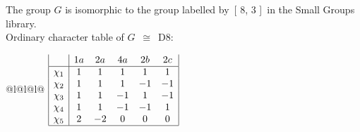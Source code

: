 \documentclass[varwidth=\maxdimen,border=10]{standalone}
\begin{document}
The group $G$ is isomorphic to the group labelled by\ [ 8, 3 ]\ in the Small Groups library.\\
Ordinary character table of $G$\ $\cong$\ D8:\\
\begin{center}
\begin{tabular}{@{}l@{}l@{}l@{}}
\hline
\(\begin{array}{|l|ccccc|}
  & 1a & 2a & 4a & 2b & 2c\\ \hline
\chi_{1} & 1 & 1 & 1 & 1 & 1\\
\chi_{2} & 1 & 1 & 1 & -1 & -1\\
\chi_{3} & 1 & 1 & -1 & 1 & -1\\
\chi_{4} & 1 & 1 & -1 & -1 & 1\\
\chi_{5} & 2 & -2 & 0 & 0 & 0\\
\hline
\end{array}\)\\
\end{tabular}
\end{center}
\end{document}
